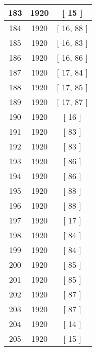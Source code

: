 \begin{center}
\begin{longtable}[H]{|| c c c ||}
\hline
183 & 1920 & [ 15 ] \\ 
\hline
184 & 1920 & [ 16, 88 ] \\ 
\hline
185 & 1920 & [ 16, 83 ] \\ 
\hline
186 & 1920 & [ 16, 86 ] \\ 
\hline
187 & 1920 & [ 17, 84 ] \\ 
\hline
188 & 1920 & [ 17, 85 ] \\ 
\hline
189 & 1920 & [ 17, 87 ] \\ 
\hline
190 & 1920 & [ 16 ] \\ 
\hline
191 & 1920 & [ 83 ] \\ 
\hline
192 & 1920 & [ 83 ] \\ 
\hline
193 & 1920 & [ 86 ] \\ 
\hline
194 & 1920 & [ 86 ] \\ 
\hline
195 & 1920 & [ 88 ] \\ 
\hline
196 & 1920 & [ 88 ] \\ 
\hline
197 & 1920 & [ 17 ] \\ 
\hline
198 & 1920 & [ 84 ] \\ 
\hline
199 & 1920 & [ 84 ] \\ 
\hline
200 & 1920 & [ 85 ] \\ 
\hline
201 & 1920 & [ 85 ] \\ 
\hline
202 & 1920 & [ 87 ] \\ 
\hline
203 & 1920 & [ 87 ] \\ 
\hline
204 & 1920 & [ 14 ] \\ 
\hline
205 & 1920 & [ 15 ] \\ 
\hline
\end{longtable}
\end{center}
